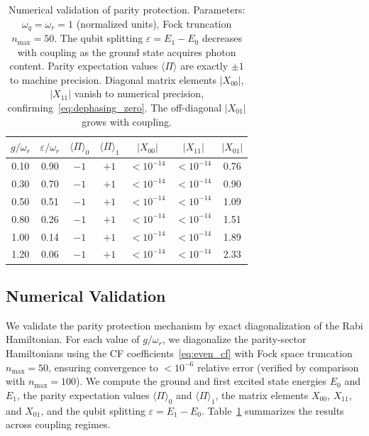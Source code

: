 \documentclass[reprint, floatfix, superscriptaddress, amsmath, amssymb, longbibliography]{revtex4-2}
\begin{document}
\begin{table}[t]
\centering
\caption{Numerical validation of parity protection. Parameters: $\omega_q = \omega_r = 1$ (normalized units), Fock truncation $n_{\mathrm{max}} = 50$. The qubit splitting $\varepsilon = E_1 - E_0$ decreases with coupling as the ground state acquires photon content. Parity expectation values $\langle\Pi\rangle$ are exactly $\pm 1$ to machine precision. Diagonal matrix elements $|X_{00}|$, $|X_{11}|$ vanish to numerical precision, confirming~\eqref{eq:dephasing_zero}. The off-diagonal $|X_{01}|$ grows with coupling.}
\label{tab:parity_numerics}
\begin{tabular}{ccccccc}
\hline\hline
$g/\omega_r$ & $\varepsilon/\omega_r$ & $\langle\Pi\rangle_0$ & $\langle\Pi\rangle_1$ & $|X_{00}|$ & $|X_{11}|$ & $|X_{01}|$ \\
\hline
0.10 & 0.90 & $-1$ & $+1$ & $<10^{-14}$ & $<10^{-14}$ & 0.76 \\
0.30 & 0.70 & $-1$ & $+1$ & $<10^{-14}$ & $<10^{-14}$ & 0.90 \\
0.50 & 0.51 & $-1$ & $+1$ & $<10^{-14}$ & $<10^{-14}$ & 1.09 \\
0.80 & 0.26 & $-1$ & $+1$ & $<10^{-14}$ & $<10^{-14}$ & 1.51 \\
1.00 & 0.14 & $-1$ & $+1$ & $<10^{-14}$ & $<10^{-14}$ & 1.89 \\
1.20 & 0.06 & $-1$ & $+1$ & $<10^{-14}$ & $<10^{-14}$ & 2.33 \\
\hline\hline
\end{tabular}
\end{table}

\subsection{Numerical Validation}
\label{sec:numerical_validation}
We validate the parity protection mechanism by exact diagonalization of the Rabi Hamiltonian. For each value of $g/\omega_r$, we diagonalize the parity-sector Hamiltonians using the CF coefficients~\eqref{eq:even_cf} with Fock space truncation $n_{\mathrm{max}} = 50$, ensuring convergence to $<10^{-6}$ relative error (verified by comparison with $n_{\mathrm{max}} = 100$). We compute the ground and first excited state energies $E_0$ and $E_1$, the parity expectation values $\langle\Pi\rangle_0$ and $\langle\Pi\rangle_1$, the matrix elements $X_{00}$, $X_{11}$, and $X_{01}$, and the qubit splitting $\varepsilon = E_1 - E_0$. Table~\ref{tab:parity_numerics} summarizes the results across coupling regimes.
\end{document}
